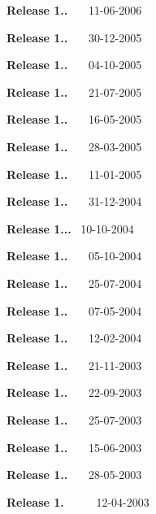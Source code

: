 \begin{DoxyItemize}
\item {\bfseries{Release 1..}}~~~ 11-\/06-\/2006 
\item {\bfseries{Release 1..}}~~~ 30-\/12-\/2005 
\item {\bfseries{Release 1..}}~~~ 04-\/10-\/2005 
\item {\bfseries{Release 1..}}~~~ 21-\/07-\/2005 
\item {\bfseries{Release 1..}}~~~ 16-\/05-\/2005 
\item {\bfseries{Release 1..}}~~~ 28-\/03-\/2005 
\item {\bfseries{Release 1..}}~~~ 11-\/01-\/2005 
\item {\bfseries{Release 1..}}~~~ 31-\/12-\/2004 
\item {}
 
\item {\bfseries{Release 1...}}~ 10-\/10-\/2004 
\item {\bfseries{Release 1..}}~~~ 05-\/10-\/2004 
\item {\bfseries{Release 1..}}~~~ 25-\/07-\/2004 
\item {\bfseries{Release 1..}}~~~ 07-\/05-\/2004 
\item {\bfseries{Release 1..}}~~~ 12-\/02-\/2004 
\item {\bfseries{Release 1..}}~~~ 21-\/11-\/2003 
\item {\bfseries{Release 1..}}~~~ 22-\/09-\/2003 
\item {\bfseries{Release 1..}}~~~ 25-\/07-\/2003 
\item {\bfseries{Release 1..}}~~~ 15-\/06-\/2003 
\item {\bfseries{Release 1..}}~~~ 28-\/05-\/2003 
\item {\bfseries{Release 1.}}~~~~~ 12-\/04-\/2003 
\item {}
 

\end{DoxyItemize}
